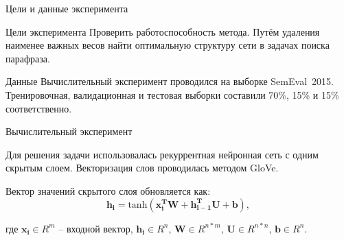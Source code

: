 \documentclass{beamer}
\begin{document}
\begin{frame}{Цели и данные эксперимента}

\begin{block}{Цели эксперимента}
Проверить работоспособность метода. Путём удаления наименее важных весов найти оптимальную структуру сети в задачах поиска парафраза.
\end{block}

\begin{block}{Данные}
Вычислительный эксперимент проводился на выборке SemEval~2015. Тренировочная, валидационная и тестовая выборки составили 70\%, 15\% и 15\% соответственно.
\end{block}

\end{frame}

\begin{frame}{Вычислительный эксперимент}

Для решения задачи использовалась рекуррентная нейронная сеть с одним скрытым слоем.
Векторизация слов проводилась методом GloVe.

Вектор значений скрытого слоя обновляется как:
$$\mathbf{h_i} = \text{tanh}(\mathbf{x_i^TW} + \mathbf{h_{i-1}^TU} + \mathbf{b}),$$

где $\mathbf{x_i}\in R^m$ -- входной вектор, $\mathbf{h_i}\in R^n$, $\mathbf{W}\in R^{n*m}$, $\mathbf{U}\in R^{n*n}$, $\mathbf{b} \in R^n$.

\end{frame}
\end{document}
